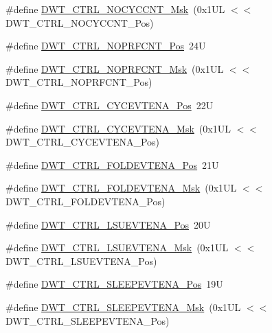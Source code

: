 \begin{DoxyCompactItemize}
\item 
\#define \hyperlink{group___c_m_s_i_s___d_w_t_gaf40c8d7a4fd978034c137e90f714c143}{D\+W\+T\+\_\+\+C\+T\+R\+L\+\_\+\+N\+O\+C\+Y\+C\+C\+N\+T\+\_\+\+Msk}~(0x1\+U\+L $<$$<$ D\+W\+T\+\_\+\+C\+T\+R\+L\+\_\+\+N\+O\+C\+Y\+C\+C\+N\+T\+\_\+\+Pos)
\item 
\#define \hyperlink{group___c_m_s_i_s___d_w_t_gad52a0e5be84363ab166cc17beca0d048}{D\+W\+T\+\_\+\+C\+T\+R\+L\+\_\+\+N\+O\+P\+R\+F\+C\+N\+T\+\_\+\+Pos}~24U
\item 
\#define \hyperlink{group___c_m_s_i_s___d_w_t_gafd8448d7db4bc51f27f202e6e1f27823}{D\+W\+T\+\_\+\+C\+T\+R\+L\+\_\+\+N\+O\+P\+R\+F\+C\+N\+T\+\_\+\+Msk}~(0x1\+U\+L $<$$<$ D\+W\+T\+\_\+\+C\+T\+R\+L\+\_\+\+N\+O\+P\+R\+F\+C\+N\+T\+\_\+\+Pos)
\item 
\#define \hyperlink{group___c_m_s_i_s___d_w_t_ga0cb0640aaeb18a626d7823570d5c3cb6}{D\+W\+T\+\_\+\+C\+T\+R\+L\+\_\+\+C\+Y\+C\+E\+V\+T\+E\+N\+A\+\_\+\+Pos}~22U
\item 
\#define \hyperlink{group___c_m_s_i_s___d_w_t_ga40554bd81460e39abf08810f45fac1a2}{D\+W\+T\+\_\+\+C\+T\+R\+L\+\_\+\+C\+Y\+C\+E\+V\+T\+E\+N\+A\+\_\+\+Msk}~(0x1\+U\+L $<$$<$ D\+W\+T\+\_\+\+C\+T\+R\+L\+\_\+\+C\+Y\+C\+E\+V\+T\+E\+N\+A\+\_\+\+Pos)
\item 
\#define \hyperlink{group___c_m_s_i_s___d_w_t_ga5602b0707f446ce78d88ff2a3a82bfff}{D\+W\+T\+\_\+\+C\+T\+R\+L\+\_\+\+F\+O\+L\+D\+E\+V\+T\+E\+N\+A\+\_\+\+Pos}~21U
\item 
\#define \hyperlink{group___c_m_s_i_s___d_w_t_ga717e679d775562ae09185a3776b1582f}{D\+W\+T\+\_\+\+C\+T\+R\+L\+\_\+\+F\+O\+L\+D\+E\+V\+T\+E\+N\+A\+\_\+\+Msk}~(0x1\+U\+L $<$$<$ D\+W\+T\+\_\+\+C\+T\+R\+L\+\_\+\+F\+O\+L\+D\+E\+V\+T\+E\+N\+A\+\_\+\+Pos)
\item 
\#define \hyperlink{group___c_m_s_i_s___d_w_t_gaea5d1ee72188dc1d57b54c60a9f5233e}{D\+W\+T\+\_\+\+C\+T\+R\+L\+\_\+\+L\+S\+U\+E\+V\+T\+E\+N\+A\+\_\+\+Pos}~20U
\item 
\#define \hyperlink{group___c_m_s_i_s___d_w_t_gac47427f455fbc29d4b6f8a479169f2b2}{D\+W\+T\+\_\+\+C\+T\+R\+L\+\_\+\+L\+S\+U\+E\+V\+T\+E\+N\+A\+\_\+\+Msk}~(0x1\+U\+L $<$$<$ D\+W\+T\+\_\+\+C\+T\+R\+L\+\_\+\+L\+S\+U\+E\+V\+T\+E\+N\+A\+\_\+\+Pos)
\item 
\#define \hyperlink{group___c_m_s_i_s___d_w_t_ga9c6d62d121164013a8e3ee372f17f3e5}{D\+W\+T\+\_\+\+C\+T\+R\+L\+\_\+\+S\+L\+E\+E\+P\+E\+V\+T\+E\+N\+A\+\_\+\+Pos}~19U
\item 
\#define \hyperlink{group___c_m_s_i_s___d_w_t_ga2f431b3734fb840daf5b361034856da9}{D\+W\+T\+\_\+\+C\+T\+R\+L\+\_\+\+S\+L\+E\+E\+P\+E\+V\+T\+E\+N\+A\+\_\+\+Msk}~(0x1\+U\+L $<$$<$ D\+W\+T\+\_\+\+C\+T\+R\+L\+\_\+\+S\+L\+E\+E\+P\+E\+V\+T\+E\+N\+A\+\_\+\+Pos)

\end{DoxyCompactItemize}
